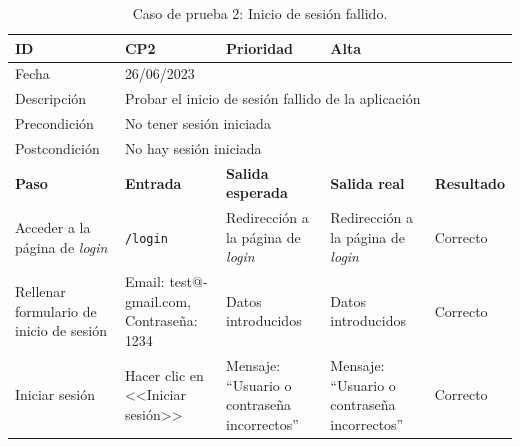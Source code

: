 \begin{table}[H]
\small
\begin{tabular}{p{} p{} p{} p{} p{}}
\cellcolor{gray!25}
ID   & CP2 & \cellcolor{gray!25} Prioridad   & Alta \\ \hline
\cellcolor{gray!25} Fecha	&	\multicolumn{4}{l}{26/06/2023} \\ \hline
\cellcolor{gray!25} Descripción		&	\multicolumn{4}{l}{Probar el inicio de sesión fallido de la aplicación} \\ \hline                                            
\cellcolor{gray!25}
Precondición  & \multicolumn{4}{l}{No tener sesión iniciada} \\ \hline
\cellcolor{gray!25} Postcondición & \multicolumn{4}{l}{No hay sesión iniciada}                                                    \\ \hline
\rowcolor{gray!25}
\textbf{Paso}   & \textbf{Entrada} & \textbf{Salida esperada} & \textbf{Salida real} & \textbf{Resultado} \\ \hline
Acceder a la página de \textit{login} 
& \texttt{/login}                                                                             
& Redirección a la página de \textit{login}                                    
& Redirección a la página de \textit{login}                                   
& Correcto                            
\\ \hline
Rellenar formulario de inicio de sesión
& Email: test@-
gmail.com, Contraseña: 1234
& Datos introducidos                               
& Datos introducidos                               
& Correcto                            
\\ \hline
Iniciar sesión
& Hacer clic en <<Iniciar sesión>>
& Mensaje: ``Usuario o contraseña incorrectos''
& Mensaje: ``Usuario o contraseña incorrectos''
& Correcto                            
\\ \hline                 
\end{tabular}
\caption{Caso de prueba 2: Inicio de sesión fallido.}\label{table:CP2}
\end{table}

